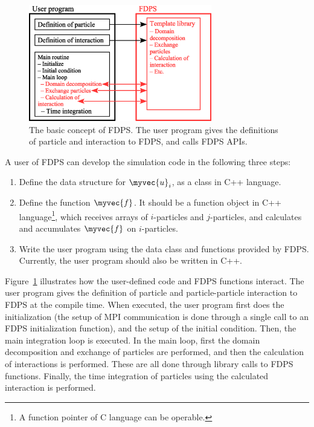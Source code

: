 \begin{figure}
  \begin{center}
    \includegraphics[width=8cm]{fig/concept.eps}
  \end{center}
  \caption{The basic concept of FDPS. The user program gives the
    definitions of particle and interaction to FDPS, and calls FDPS
    APIs.}
  \label{fig:concept}
\end{figure}

A user of FDPS can develop the simulation code in the following three
steps:
\begin{enumerate}
\item Define the data structure for $\myvec{u}_i$, as a class in C++
  language.
\item Define the function $\myvec{f}$. It should be a function object
  in C++ language\footnote{A function pointer of C language can be
    operable.}, which receives arrays of $i$-particles and
  $j$-particles, and calculates and accumulates $\myvec{f}$ on
  $i$-particles.
\item Write the user program using the data class and functions
  provided by FDPS. Currently, the user program should also be written
  in C++.
\end{enumerate}

Figure~\ref{fig:concept} illustrates how the user-defined code and
FDPS functions interact. The user program gives the definition of
particle and particle-particle interaction to FDPS at the compile
time. When executed, the user program first does the initialization
(the setup of MPI communication is done through a single call to an
FDPS initialization function), and the setup of the initial
condition. Then, the main integration loop is executed. In the main
loop, first the domain decomposition and exchange of particles are
performed, and then the calculation of interactions is
performed. These are all done through library calls to FDPS
functions. Finally, the time integration of particles using the
calculated interaction is performed.

